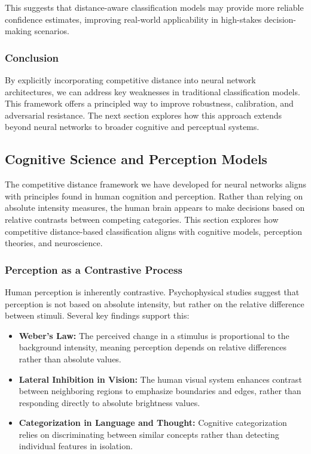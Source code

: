 \documentclass[12pt]{article}
\begin{document}
This suggests that distance-aware classification models may provide more reliable confidence estimates, improving real-world applicability in high-stakes decision-making scenarios.

\subsubsection{Conclusion}

By explicitly incorporating competitive distance into neural network architectures, we can address key weaknesses in traditional classification models. This framework offers a principled way to improve robustness, calibration, and adversarial resistance. The next section explores how this approach extends beyond neural networks to broader cognitive and perceptual systems.

\subsection{Cognitive Science and Perception Models}

The competitive distance framework we have developed for neural networks aligns with principles found in human cognition and perception. Rather than relying on absolute intensity measures, the human brain appears to make decisions based on relative contrasts between competing categories. This section explores how competitive distance-based classification aligns with cognitive models, perception theories, and neuroscience.

\subsubsection{Perception as a Contrastive Process}

Human perception is inherently contrastive. Psychophysical studies suggest that perception is not based on absolute intensity, but rather on the relative difference between stimuli. Several key findings support this:

\begin{itemize}
    \item \textbf{Weber’s Law:} The perceived change in a stimulus is proportional to the background intensity, meaning perception depends on relative differences rather than absolute values.
    \item \textbf{Lateral Inhibition in Vision:} The human visual system enhances contrast between neighboring regions to emphasize boundaries and edges, rather than responding directly to absolute brightness values.
    \item \textbf{Categorization in Language and Thought:} Cognitive categorization relies on discriminating between similar concepts rather than detecting individual features in isolation.
\end{itemize}
\end{document}
